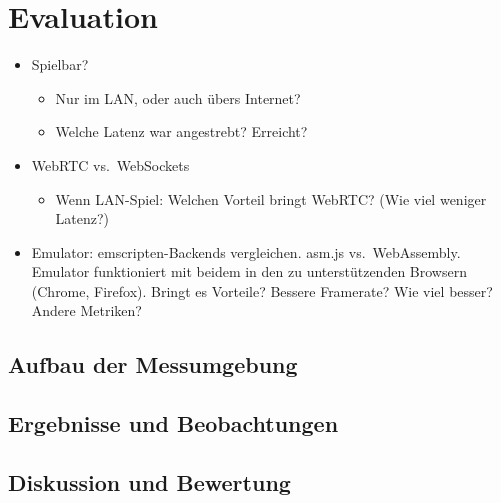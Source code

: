 \chapter{Evaluation}\label{evaluation}

\blindtext[1]

\begin{itemize}
\tightlist
\item
  Spielbar?

  \begin{itemize}
  \tightlist
  \item
    Nur im LAN, oder auch übers Internet?
  \item
    Welche Latenz war angestrebt? Erreicht?
  \end{itemize}
\item
  WebRTC vs.~WebSockets

  \begin{itemize}
  \tightlist
  \item
    Wenn LAN-Spiel: Welchen Vorteil bringt WebRTC? (Wie viel weniger
    Latenz?)
  \end{itemize}
\item
  Emulator: emscripten-Backends vergleichen. asm.js vs.~WebAssembly.
  Emulator funktioniert mit beidem in den zu unterstützenden Browsern
  (Chrome, Firefox). Bringt es Vorteile? Bessere Framerate? Wie viel
  besser? Andere Metriken?
\end{itemize}

\section{Aufbau der Messumgebung}\label{aufbau-der-messumgebung}

\section{Ergebnisse und
Beobachtungen}\label{ergebnisse-und-beobachtungen}

\section{Diskussion und Bewertung}\label{diskussion-und-bewertung}
